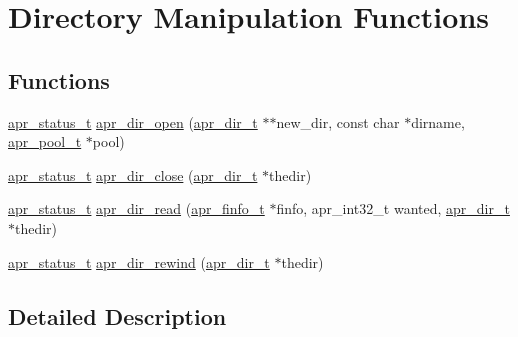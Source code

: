 \hypertarget{group__apr__dir}{\section{Directory Manipulation Functions}
\label{group__apr__dir}
}
\subsection*{Functions}
\begin{DoxyCompactItemize}
\item 
\hyperlink{group__apr__errno_gaf76ee4543247e9fb3f3546203e590a6c}{apr\-\_\-status\-\_\-t} \hyperlink{group__apr__dir_ga796002db3e3c7b7c9d5632efbcd4329c}{apr\-\_\-dir\-\_\-open} (\hyperlink{group__apr__file__info_ga92ed8cf52cba2abb42cf74087aa74da8}{apr\-\_\-dir\-\_\-t} $\ast$$\ast$new\-\_\-dir, const char $\ast$dirname, \hyperlink{group__apr__pools_gaf137f28edcf9a086cd6bc36c20d7cdfb}{apr\-\_\-pool\-\_\-t} $\ast$pool)
\item 
\hyperlink{group__apr__errno_gaf76ee4543247e9fb3f3546203e590a6c}{apr\-\_\-status\-\_\-t} \hyperlink{group__apr__dir_ga57fef00ccea03e9244f6fa21da4d3359}{apr\-\_\-dir\-\_\-close} (\hyperlink{group__apr__file__info_ga92ed8cf52cba2abb42cf74087aa74da8}{apr\-\_\-dir\-\_\-t} $\ast$thedir)
\item 
\hyperlink{group__apr__errno_gaf76ee4543247e9fb3f3546203e590a6c}{apr\-\_\-status\-\_\-t} \hyperlink{group__apr__dir_ga3e4ee253e0c712160bee10bfb9c8e4a8}{apr\-\_\-dir\-\_\-read} (\hyperlink{structapr__finfo__t}{apr\-\_\-finfo\-\_\-t} $\ast$finfo, apr\-\_\-int32\-\_\-t wanted, \hyperlink{group__apr__file__info_ga92ed8cf52cba2abb42cf74087aa74da8}{apr\-\_\-dir\-\_\-t} $\ast$thedir)
\item 
\hyperlink{group__apr__errno_gaf76ee4543247e9fb3f3546203e590a6c}{apr\-\_\-status\-\_\-t} \hyperlink{group__apr__dir_gab9b9f23e76128144d3fb953cabea6290}{apr\-\_\-dir\-\_\-rewind} (\hyperlink{group__apr__file__info_ga92ed8cf52cba2abb42cf74087aa74da8}{apr\-\_\-dir\-\_\-t} $\ast$thedir)
\end{DoxyCompactItemize}


\subsection{Detailed Description}


